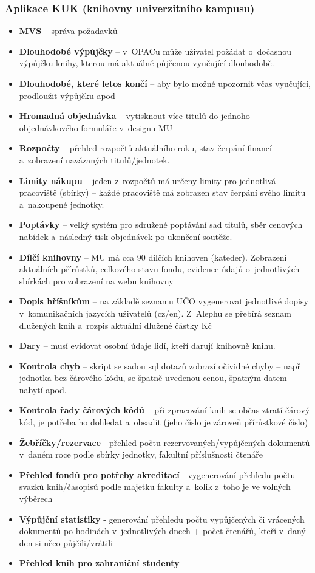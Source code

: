 \documentclass[
	11pt, oneside, printed, final, palatino, monochrome
	microtype,
	table,   %
	lof,     %
	lot     %
]{fithesis3}
\newcommand{\bold}[1]{\textbf{#1}}
\begin{document}
{\subsubsection{Aplikace KUK (knihovny univerzitního kampusu)}
\begin{itemize}
\item \bold{MVS} – správa požadavků
\item \bold{Dlouhodobé výpůjčky} – v~OPACu může uživatel požádat o~dočasnou výpůjčku knihy, kterou má aktuálně půjčenou vyučující dlouhodobě.
\item \bold{Dlouhodobé, které letos končí} – aby bylo možné upozornit včas vyučující, prodloužit výpůjčku apod
\item \bold{Hromadná objednávka} – vytisknout více titulů do jednoho objednávkového formuláře v~designu MU
\item \bold{Rozpočty} – přehled rozpočtů aktuálního roku, stav čerpání financí a~zobrazení navázaných titulů/jednotek.
\item \bold{Limity nákupu} – jeden z~rozpočtů má určeny limity pro jednotlivá pracoviště (sbírky) – každé pracoviště má zobrazen stav čerpání svého limitu a~nakoupené jednotky.
\item \bold{Poptávky} – velký systém pro sdružené poptávání sad titulů, sběr cenových nabídek a~následný tisk objednávek po ukončení soutěže.
\item \bold{Dílčí knihovny} – MU má cca 90 dílčích knihoven (kateder). Zobrazení aktuálních přírůstků, celkového stavu fondu, evidence údajů o~jednotlivých sbírkách pro zobrazení na webu knihovny
\item \bold{Dopis hříšníkům} – na základě seznamu UČO vygenerovat jednotlivé dopisy v~komunikačních jazycích uživatelů (cz/en). Z~Alephu se přebírá seznam dlužených knih a~rozpis aktuální dlužené částky Kč
\item \bold{Dary} – musí evidovat osobní údaje lidí, kteří darují knihovně knihu.
\item \bold{Kontrola chyb} – skript se sadou sql dotazů zobrazí očividné chyby – např jednotka bez čárového kódu, se špatně uvedenou cenou, špatným datem nabytí apod.
\item \bold{Kontrola řady čárových kódů} – při zpracování knih se občas ztratí čárový kód, je potřeba ho dohledat a~obsadit (jeho číslo je zároveň přírůstkové číslo)
\item \bold{Žebříčky/rezervace} - přehled počtu rezervovaných/vypůjčených dokumentů v~daném roce podle sbírky jednotky, fakultní příslušnosti čtenáře
\item \bold{Přehled fondů pro potřeby akreditací} - vygenerování přehledu počtu svazků knih/časopisů podle majetku fakulty a~kolik z~toho je ve volných výběrech
\item \bold{Výpůjční statistiky} - generování přehledu počtu vypůjčených či vrácených dokumentů po hodinách v~jednotlivých dnech + počet čtenářů, kteří v~daný den si něco půjčili/vrátili
\item \bold{Přehled knih pro zahraniční studenty}
\end{itemize}

}
\end{document}
